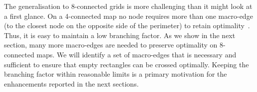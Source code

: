 The generalisation to 8-connected grids is more challenging than it might look
at a first glance.  On a 4-connected map no node requires more than one
macro-edge (to the closest node on the opposite side of the perimeter) to retain
optimality~\cite{harabor10}.  Thus, it is easy to maintain a low branching
factor.
As we show in the next section, many more macro-edges are
needed to preserve optimality on 8-connected maps. We will identify a set of
macro-edges that is necessary and sufficient to ensure that empty rectangles can
be crossed optimally.  Keeping the branching factor within reasonable limits is
a primary motivation for the enhancements reported in the next sections.

